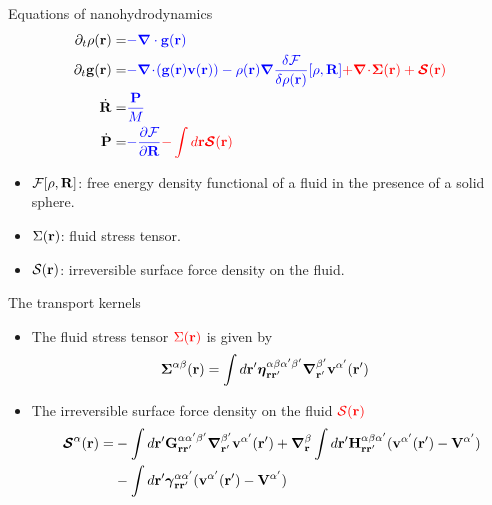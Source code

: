 \documentclass{beamer}
\newcommand{\esc}{\!\cdot\!}
\begin{document}
\begin{frame}{Equations of nanohydrodynamics}
\begin{align}
  \partial_t\rho({\bf r})=&{\color{blue} -\boldsymbol{\nabla}\cdot{\bf g}({\bf r})}
\nonumber\\
\partial_t{\bf g}({\bf r})=&{\color{blue} -\boldsymbol{\nabla}\esc{\left({\bf g}({\bf r}){\bf v}({\bf r})\right)}
-\rho({\bf r})\boldsymbol{\nabla}\frac{\delta {\cal F}}{\delta\rho({\bf r})}[\rho,{\bf R}]}
{\color{red} +\boldsymbol{\nabla}\esc\boldsymbol{\Sigma}({\bf r})+\boldsymbol{{\cal S}}({\bf r})}
\nonumber\\
\dot{\bf R}=&{\color{blue} \frac{\bf P}{M}}
\nonumber\\
\dot{\bf P}=&{\color{blue} -\frac{\partial {\cal F}}{\partial {\bf R}}}
{\color{red} -\int d {{\bf r}}\boldsymbol{{\cal S}}({\bf r})}
\nonumber
\end{align}

\begin{itemize}
  \item ${\cal F}[\rho, {\bf R}]$: free energy density functional of a fluid in the presence of a solid sphere.
  \item $\Sigma({\bf r})$: fluid stress tensor.
  \item ${\cal S}({\bf r})$: irreversible surface force density on the fluid.
\end{itemize}
\end{frame}

\begin{frame}{The transport kernels}
  \begin{itemize}
    \item The fluid stress tensor ${\color{red} \Sigma({\bf r})}$ is given by 
  \begin{align}
  \boldsymbol{\Sigma}^{\alpha\beta}({\bf r})&=
\int d{\bf r}'
\boldsymbol{\eta}^{\alpha\beta\alpha'\beta'}_{{\bf r}{\bf r}'}
\boldsymbol{\nabla}_{{\bf r}'}^{\beta'}{\bf v}^{\alpha'}({\bf r}')
\nonumber
\end{align}
\item The irreversible surface force density on the fluid ${\color{red} {\cal S}({\bf r})}$
\begin{align}
  \boldsymbol{{\cal S}}^\alpha({\bf r})=&
-\int d{\bf r}'{\bf G}^{\alpha\alpha'\beta'}_{{\bf r}{\bf r}'}
\boldsymbol{\nabla}_{{\bf r}'}^{\beta'} {\bf v}^{\alpha'}({\bf r}')
+\boldsymbol{\nabla}_{{\bf r}}^{\beta}\int d{\bf r}'{\bf H}^{\alpha\beta\alpha'}_{{\bf r}{\bf r}'}
( {\bf v}^{\alpha'}({\bf r}')-{\bf V}^{\alpha'})
\nonumber\\
&-\int d{\bf r}'
\boldsymbol{\gamma}^{\alpha\alpha'}_{{\bf r}{\bf r}'}( {\bf v}^{\alpha'}({\bf r}')
-{\bf V}^{\alpha'})
\nonumber
\end{align}
\end{itemize}
\end{frame}
\end{document}
